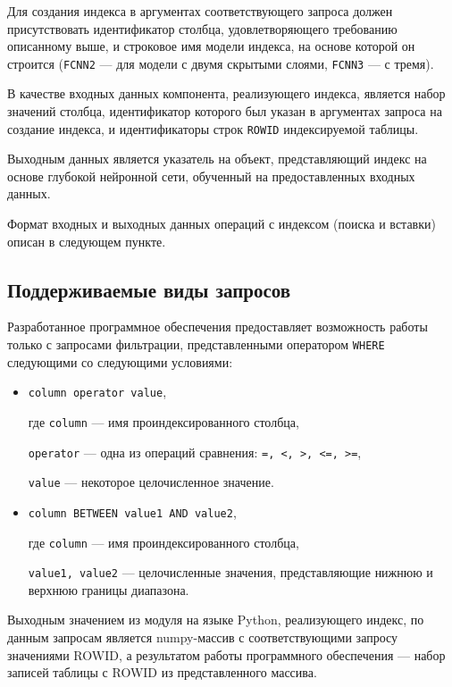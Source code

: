 Для создания индекса в аргументах соответствующего запроса должен присутствовать
идентификатор столбца, удовлетворяющего требованию описанному выше, и строковое
имя модели индекса, на основе которой он строится (\texttt{FCNN2} --- для модели
с двумя скрытыми слоями, \texttt{FCNN3} --- с тремя).

В качестве входных данных компонента, реализующего индекса, является набор
значений столбца, идентификатор которого был указан в аргументах запроса на
создание индекса, и идентификаторы строк \texttt{ROWID} индексируемой таблицы.

Выходным данных является указатель на объект, представляющий индекс на основе
глубокой нейронной сети, обученный на предоставленных входных данных.

Формат входных и выходных данных операций с индексом (поиска и вставки) описан в
следующем пункте.

\subsection{Поддерживаемые виды запросов}

Разработанное программное обеспечения предоставляет возможность работы только с
запросами фильтрации, представленными оператором \texttt{WHERE} следующими со
следующими условиями:

\begin{itemize}
    \item \texttt{column operator value},

        где \texttt{column} --- имя проиндексированного столбца,

        \texttt{operator} --- одна из операций сравнения: \texttt{=, <, >, <=, >=},

        \texttt{value} --- некоторое целочисленное значение.

    \item \texttt{column BETWEEN value1 AND value2},
        
        где \texttt{column} --- имя проиндексированного столбца,

        \texttt{value1, value2} --- целочисленные значения, представляющие
        нижнюю и верхнюю границы диапазона.
\end{itemize}

Выходным значением из модуля на языке Python, реализующего индекс, по данным
запросам является numpy-массив с соответствующими запросу значениями ROWID, а
результатом работы программного обеспечения --- набор записей таблицы с ROWID из
представленного массива.

